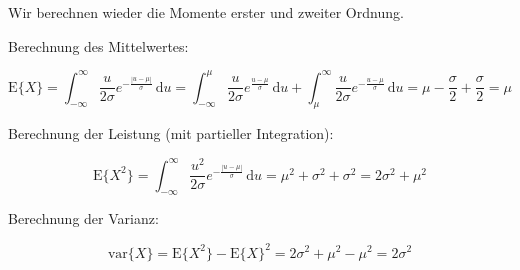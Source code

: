 \begin{beweis}
Wir berechnen wieder die Momente erster und zweiter Ordnung.

Berechnung des Mittelwertes:

$$
\mathrm{E}\{X\} = \int_{-\infty}^{\infty} \frac{u}{2\sigma} e^{-\frac{|u-\mu|}{\sigma}}\,\mathrm{d}u
= \int_{-\infty}^{\mu} \frac{u}{2\sigma} e^{\frac{u-\mu}{\sigma}}\,\mathrm{d}u + \int_{\mu}^{\infty} \frac{u}{2\sigma} e^{-\frac{u-\mu}{\sigma}}\,\mathrm{d}u
= \mu - \frac{\sigma}{2} + \frac{\sigma}{2} = \mu
$$

Berechnung der Leistung (mit partieller Integration):

$$
\mathrm{E}\{X^2\} = \int_{-\infty}^{\infty} \frac{u^2}{2\sigma} e^{-\frac{|u-\mu|}{\sigma}}\,\mathrm{d}u = \mu^2 + \sigma^2 + \sigma^2 = 2\sigma^2 + \mu^2
$$

Berechnung der Varianz:

$$
\mathrm{var}\{X\} = \mathrm{E}\{X^2\} - \mathrm{E}\{X\}^2 = 2\sigma^2 + \mu^2 - \mu^2 = 2\sigma^2
$$
\end{beweis}


